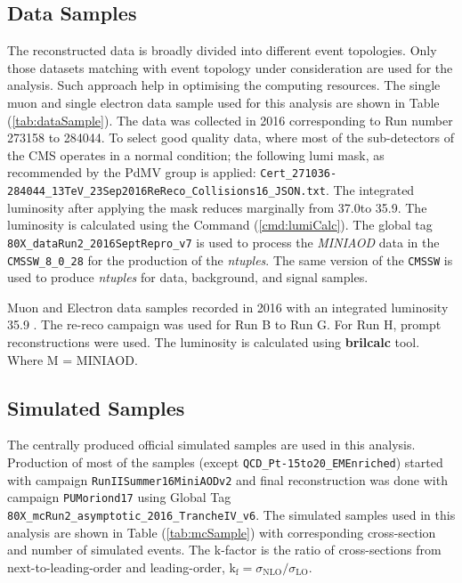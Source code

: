 
\subsection{Data Samples}
The reconstructed data is broadly divided into different event topologies. Only those 
datasets matching with event topology under consideration are used for the analysis. 
Such approach help in optimising the computing resources.
The single muon and single electron data sample used for this analysis are shown in
Table (\ref{tab:dataSample}). The data was collected in 2016 corresponding to Run number 
273158 to 284044. To select good quality data, where most of the sub-detectors of the CMS 
operates in a normal condition; the following lumi mask, as recommended by the PdMV group is applied:
\verb|Cert_271036-284044_13TeV_23Sep2016ReReco_Collisions16_JSON.txt|. The integrated luminosity
after applying the mask reduces marginally from 37.0\fbinv to
35.9\fbinv. The luminosity is calculated using the Command (\ref{cmd:lumiCalc}). 
The global tag \verb|80X_dataRun2_2016SeptRepro_v7| is used to process the {\em MINIAOD}
data in the \verb|CMSSW_8_0_28| for the production of the {\em ntuples}. The same version
of the \verb|CMSSW| is used to produce {\em ntuples} for data, background, and signal samples.

\begin{table}
\centering
    \caption{Muon and Electron data samples recorded in 2016 with an integrated luminosity 35.9
    \fbinv. The re-reco campaign was used for Run B to Run G. For Run H, prompt reconstructions were used. 
    The luminosity is calculated using {\bf{brilcalc}} tool. Where M = \/MINIAOD.} 
\label{tab:dataSample}

\end{table}

\subsection{Simulated Samples}
The centrally produced official simulated samples are used in this analysis. 
Production of most of the samples (except 
\verb|QCD_Pt-15to20_EMEnriched|) started with campaign 
\verb|RunIISummer16MiniAODv2| and final reconstruction was done with 
campaign \verb|PUMoriond17| using Global Tag \\ 
\verb|80X_mcRun2_asymptotic_2016_TrancheIV_v6|. 
The simulated samples used in this analysis are shown in Table (\ref{tab:mcSample}) 
with corresponding cross-section and number of simulated events. 
The k-factor is the ratio of cross-sections from next-to-leading-order 
and leading-order, k$_\text{f} =\sigma_{\text{NLO}}/\sigma_{\text{LO}}$.

